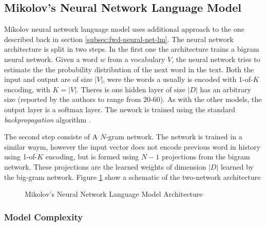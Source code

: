 

\subsection{Mikolov's Neural Network Language Model}
\label{sec:mikolov-neural-net-model}

Mikolov neural network language model uses additional approach to the one
described back in section \ref{subsec:fwd-neural-net-lm}.  The neural network
architecture is split in two steps. In the first one the architecture trains
a bigram neural network. Given a word $w$ from a vocabulary $V$, the neural
network tries to estimate the the probability distribution of the next word
in the text. Both the input and output are of size $|V|$, were the words a
usually is encoded with 1-of-$K$ encoding, with $K=|V|$.  Theres is one hidden layer of
size $|D|$ has an arbitrary size (reported by the authors  to range from 20-60). As with the
other models, the output layer  is a  softmax layer. The nework is trained
using the standard \textit{backpropagation} algorithm
\cite{conf/icassp/MikolovKBGC09}. 

The second step consiste of  A $N$-gram network. The network is trained in a
similar waym, however the input vector does not encode previous word in
history using 1-of-$K$ encoding, but is formed using $N-1$ projections from
the  bigram network. These projections are the learned weights of dimension
$|D|$ learned by the big-gram network. Figure \ref{fig:mikolov_nnlm_architecture} show a schematic of the
two-network architecture 


\begin{figure}[hptb!]
    \centering
    \caption{Mikolov's Neural Network Language Model Architecture}
    \label{fig:mikolov_nnlm_architecture}
\end{figure}


\subsubsection{Model Complexity}

